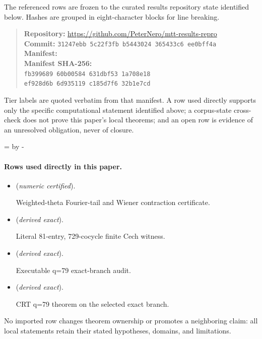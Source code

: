 \documentclass[11pt]{article}
\numberwithin{equation}{section}
\theoremstyle{definition}
\theoremstyle{plain}
\theoremstyle{remark}
\begin{document}
The referenced rows are frozen to the curated results repository state identified below. Hashes are grouped in eight-character blocks for line breaking.
\begin{quote}\small
\textbf{Repository:} \url{https://github.com/PeterNero/mtt-results-repro}\\
\textbf{Commit:} \texttt{31247ebb 5c22f3fb b5443024 365433c6 ee0bff4a}\\
\textbf{Manifest:} \\
\textbf{Manifest SHA-256:}\\
\texttt{fb399689 60b00584 631dbf53 1a708e18}\\
\texttt{ef928d6b 6d935119 c185d7f6 32b1e7cd}
\end{quote}

Tier labels are quoted verbatim from that manifest. A row used directly supports only the specific computational statement identified above; a corpus-state cross-check does not prove this paper's local theorems; and an open row is evidence of an unresolved obligation, never of closure.

\par\begingroup{}=\pagegoal\advance{} by -\pagetotal\ifdim\dimen0<7\baselineskip\newpage\fi\endgroup
\paragraph{Rows used directly in this paper.}
\begin{itemize}
\setlength{\itemsep}{0.25em}
\item {} (\emph{numeric certified}).\par Weighted-theta Fourier-tail and Wiener contraction certificate.
\item {} (\emph{derived exact}).\par Literal 81-entry, 729-cocycle finite Cech witness.
\item {} (\emph{derived exact}).\par Executable q=79 exact-branch audit.
\item {} (\emph{derived exact}).\par CRT q=79 theorem on the selected exact branch.
\end{itemize}

No imported row changes theorem ownership or promotes a neighboring claim: all local statements retain their stated hypotheses, domains, and limitations.


\end{document}
